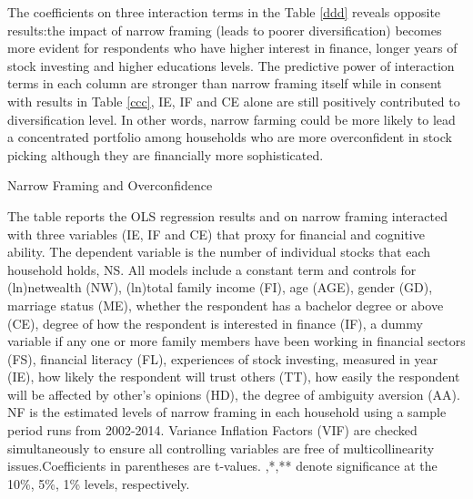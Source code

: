 \documentclass[ukenglish,nottitlepage,thmsb,11pt,letterpaper]{article}
\begin{document}
The coefficients on three interaction terms in the Table \ref{ddd} reveals opposite results:the impact of narrow framing (leads to poorer diversification) becomes more evident for respondents who have higher interest in finance, longer years of stock investing  and higher educations levels. The predictive power of interaction terms in each column are stronger than narrow framing itself while in consent with results in Table \ref{ccc}, IE, IF and CE alone are still positively contributed to diversification level. In other words, narrow farming could be more likely to lead a concentrated  portfolio  among households who are more overconfident in stock picking although they are financially more sophisticated.

\begin{spacing}{1}
	\renewcommand\arraystretch{1}%
\begin{table}[H]
	\caption{Narrow Framing and Overconfidence}
	The table reports the OLS regression results and on narrow framing interacted with three variables (IE, IF and CE) that proxy for financial and cognitive ability. The dependent variable is the number of individual stocks that each household holds, NS. All models include a constant term and controls for (ln)netwealth (NW), (ln)total family income (FI), age (AGE), gender (GD), marriage status (ME), whether the respondent has a bachelor degree or above (CE), degree of how the respondent is interested in finance (IF), a dummy variable if any one or more family members have been working in financial sectors (FS), financial literacy (FL), experiences of stock investing, measured in year (IE), how likely the respondent will trust others (TT), how easily the respondent will be affected by other's opinions (HD), the degree of ambiguity aversion (AA).  NF is the estimated levels of narrow framing in each household using a sample period runs from 2002-2014.  Variance Inflation Factors (VIF) are checked simultaneously to ensure all controlling variables are free of multicollinearity issues.Coefficients in parentheses are t-values. {\tiny*},{\tiny**},{\tiny***} denote significance at the 10\%, 5\%, 1\% levels, respectively. \\
					

\end{table}
\end{spacing}
\end{document}
